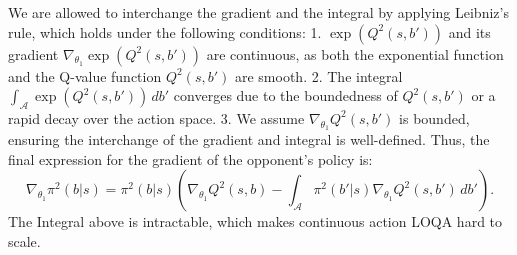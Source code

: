 \documentclass{article} \usepackage{iclr2025_conference,times}
\begin{document}
We are allowed to interchange the gradient and the integral by applying Leibniz's rule, which holds under the following conditions:
1. \( \exp(Q^2(s, b')) \) and its gradient \( \nabla_{\theta_1} \exp(Q^2(s, b')) \) are continuous, as both the exponential function and the Q-value function \( Q^2(s, b') \) are smooth.
2. The integral \( \int_{\mathcal{A}} \exp(Q^2(s, b')) \, db' \) converges due to the boundedness of \( Q^2(s, b') \) or a rapid decay over the action space.
3. We assume \( \nabla_{\theta_1} Q^2(s, b') \) is bounded, ensuring the interchange of the gradient and integral is well-defined. Thus, the final expression for the gradient of the opponent’s policy is:
\begin{equation}
    \nabla_{\theta_1} \pi^2(b | s) = \pi^2(b | s) \left( \nabla_{\theta_1} Q^2(s, b) - \int_{\mathcal{A}} \pi^2(b' | s) \nabla_{\theta_1} Q^2(s, b') \, db' \right).
\end{equation}
The Integral above is intractable, which makes continuous action LOQA hard to scale. 
\end{document}
